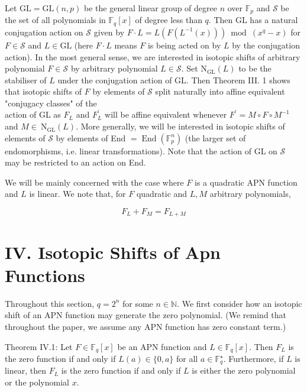 \documentclass[10pt]{article}
\begin{document}
Let $\mathrm{GL}=\mathrm{GL}(n, p)$ be the general linear group of degree $n$ over $\mathbb{F}_{p}$ and $\mathcal{S}$ be the set of all polynomials in $\mathbb{F}_{q}[x]$ of degree less than $q$. Then GL has a natural conjugation action on $\mathcal{S}$ given by $F \cdot L=L\left(F\left(L^{-1}(x)\right)\right) \bmod \left(x^{q}-x\right)$ for $F \in \mathcal{S}$ and $L \in \mathrm{GL}$ (here $F \cdot L$ means $F$ is being acted on by $L$ by the conjugation action). In the most general sense, we are interested in isotopic shifts of arbitrary polynomial $F \in \mathcal{S}$ by arbitrary polynomial $L \in \mathcal{S}$. Set $\mathrm{N}_{\mathrm{GL}}(L)$ to be the stabiliser of $L$ under the conjugation action of GL. Then Theorem III. 1 shows that isotopic shifts of $F$ by elements of $\mathcal{S}$ split naturally into affine equivalent "conjugacy classes" of the\\
action of GL as $F_{L}$ and $F_{L}^{\prime}$ will be affine equivalent whenever $F^{\prime}=M \circ F \circ M^{-1}$ and $M \in \mathrm{~N}_{\mathrm{GL}}(L)$. More generally, we will be interested in isotopic shifts of elements of $\mathcal{S}$ by elements of End $=\operatorname{End}\left(\mathbb{F}_{p}^{n}\right)$ (the larger set of endomorphisms, i.e. linear transformations). Note that the action of GL on $\mathcal{S}$ may be restricted to an action on End.

We will be mainly concerned with the case where $F$ is a quadratic APN function and $L$ is linear. We note that, for $F$ quadratic and $L, M$ arbitrary polynomials,


\begin{equation*}
F_{L}+F_{M}=F_{L+M} \tag{4}
\end{equation*}


\section*{IV. Isotopic Shifts of Apn Functions}
Throughout this section, $q=2^{n}$ for some $n \in \mathbb{N}$. We first consider how an isotopic shift of an APN function may generate the zero polynomial. (We remind that throughout the paper, we assume any APN function has zero constant term.)

Theorem IV.1: Let $F \in \mathbb{F}_{q}[x]$ be an APN function and $L \in \mathbb{F}_{q}[x]$. Then $F_{L}$ is the zero function if and only if $L(a) \in \{0, a\}$ for all $a \in \mathbb{F}_{q}^{\star}$. Furthermore, if $L$ is linear, then $F_{L}$ is the zero function if and only if $L$ is either the zero polynomial or the polynomial $x$.
\end{document}
